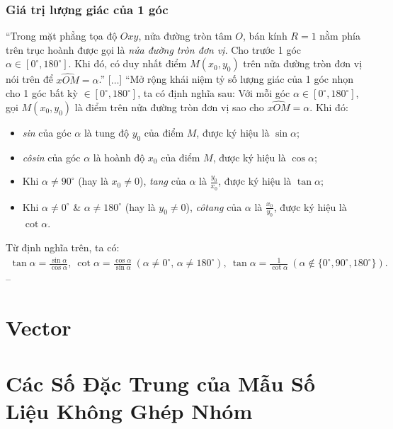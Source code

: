 \documentclass{article}
\numberwithin{equation}{section}
\begin{document}
\subsubsection{Giá trị lượng giác của 1 góc}
``Trong mặt phẳng tọa độ $Oxy$, nửa đường tròn tâm $O$, bán kính $R = 1$ nằm phía trên trục hoành được gọi là \textit{nửa đường tròn đơn vị}. Cho trước 1 góc $\alpha\in[0^\circ,180^\circ]$. Khi đó, có duy nhất điểm $M(x_0,y_0)$ trên nửa đường tròn đơn vị nói trên để $\widehat{xOM} = \alpha$.'' [$\ldots$] ``Mở rộng khái niệm tỷ số lượng giác của 1 góc nhọn cho 1 góc bất kỳ $\in[0^\circ,180^\circ]$, ta có định nghĩa sau: Với mỗi góc $\alpha\in[0^\circ,180^\circ]$, gọi $M(x_0,y_0)$ là điểm trên nửa đường tròn đơn vị sao cho $\widehat{xOM} = \alpha$. Khi đó:
\begin{itemize}
	\item \textit{sin} của góc $\alpha$ là tung độ $y_0$ của điểm $M$, được ký hiệu là $\sin\alpha$;
	\item \textit{côsin} của góc $\alpha$ là hoành độ $x_0$ của điểm $M$, được ký hiệu là $\cos\alpha$;
	\item Khi $\alpha\ne 90^\circ$ (hay là $x_0\ne 0$), \textit{tang} của $\alpha$ là $\frac{y_0}{x_0}$, được ký hiệu là $\tan\alpha$;
	\item Khi $\alpha\ne 0^\circ$ \& $\alpha\ne 180^\circ$ (hay là $y_0\ne 0$), \textit{côtang} của $\alpha$ là $\frac{x_0}{y_0}$, được ký hiệu là $\cot\alpha$.
\end{itemize}
Từ định nghĩa trên, ta có:
\begin{align*}
	\tan\alpha = \frac{\sin\alpha}{\cos\alpha},\ \cot\alpha = \frac{\cos\alpha}{\sin\alpha}\ (\alpha\ne 0^\circ,\,\alpha\ne 180^\circ),\ \tan\alpha = \frac{1}{\cot\alpha}\ (\alpha\notin\{0^\circ,90^\circ,180^\circ\}).
\end{align*}
-- \cite[p. 34]{Khoai_Anh_Tan_Thang_Anh_Cuong_Duong_Dang_Ha_Hanh_Hong_Son_Tuan_Vuong_Toan_10_tap_1}



\section{Vector}


\section{Các Số Đặc Trung của Mẫu Số Liệu Không Ghép Nhóm}
\end{document}
